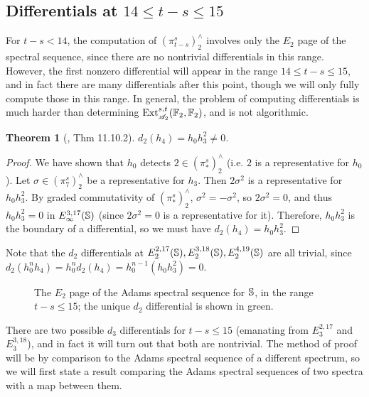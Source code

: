 \documentclass[11pt, titlepage]{article} %
\def\bb{\ensuremath\mathbb}
\def\A{\ensuremath{\mathscr{A}_2}}
\DeclareMathOperator{\Ext}{Ext}
\numberwithin{equation}{subsection}
\theoremstyle{plain}
\newtheorem{theorem}{Theorem}[subsection]
\theoremstyle{definition}
\begin{document}
\subsection{Differentials at \(14\leq t-s\leq 15\)}\label{2504291253}

For \(t-s<14\), the computation of \((\pi_{t-s}^s)^\wedge_2\) involves only the \(E_2\) page of the spectral sequence, since there are no nontrivial differentials in this range.  However, the first nonzero differential will appear in the range \(14\leq t-s\leq15\), and in fact there are many differentials after this point, though we will only fully compute those in this range. In general, the problem of computing differentials is much harder than  determining \(\Ext_{\A}^{s,t}(\bb{F}_2, \bb{F}_2)\), and is not algorithmic. 

\begin{theorem}[{\autocite{rognes2}, Thm 11.10.2}]
\(d_2(h_4)=h_0h_3^2\neq 0\).
\end{theorem}

\begin{proof}
We have shown that \(h_0\) detects \(2\in (\pi_*^s)^\wedge_2\) (i.e. \(2\) is a representative for \(h_0\)). Let \(\sigma\in (\pi_7^s)^\wedge_2\) be a representative for \(h_3\). Then \(2 \sigma^2\) is a representative for \(h_0h_3^2\). By graded commutativity of \((\pi_*^s)^\wedge_2\), \(\sigma^2=-\sigma^2\), so \(2 \sigma^2=0\), and thus \(h_0h_3^2=0\) in \(E_\infty^{3,17}(\bb{S})\) (since \(2\sigma^2=0\) is a representative for it). Therefore, \(h_0h_3^2\) is the boundary of a differential, so we must have \(d_2(h_4)=h_0h_3^2\).
\end{proof}

Note that the \(d_2\) differentials at \(E_2^{2, 17}(\bb{S}),  E_2^{3, 18}(\bb{S}), E_2^{4, 19}(\bb{S})\) are all trivial, since \(d_2(h_0^nh_4)=h_0^nd_2(h_4)=h_0^{n-1}(h_0h_3^2)=0\). 

\begin{figure}
\centering

\caption{The \(E_2\) page of the Adams spectral sequence for \(\bb{S}\), in the range \(t-s\leq 15\); the unique \(d_2\) differential is shown in green.}
\label{2504241227}
\end{figure}

There are two possible \(d_3\) differentials for \(t-s\leq 15\) (emanating from \(E_3^{2,17}\) and \(E_3^{3,18}\)), and in fact it will turn out that both are nontrivial. The method of proof will be by comparison to the Adams spectral sequence of a different spectrum, so we will first state a result comparing the Adams spectral sequences of two spectra with a map between them.
\end{document}
